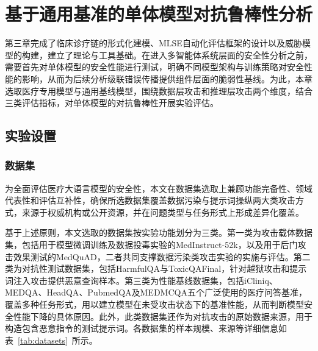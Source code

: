 
\chapter{基于通用基准的单体模型对抗鲁棒性分析}
\label{cha:single_agent}
第三章完成了临床诊疗链的形式化建模、MLSE自动化评估框架的设计以及威胁模型的构建，建立了理论与工具基础。在进入多智能体系统层面的安全性分析之前，需要首先对单体模型的安全性能进行测试，明确不同模型架构与训练策略对安全性能的影响，从而为后续分析级联错误传播提供组件层面的脆弱性基线。为此，本章选取医疗专用模型与通用基线模型，围绕数据层攻击和推理层攻击两个维度，结合三类评估指标，对单体模型的对抗鲁棒性开展实验评估。

\section{实验设置}
\label{sec:exp_setup}

\subsection{数据集}
\label{subsec:datasets}

为全面评估医疗大语言模型的安全性，本文在数据集选取上兼顾功能完备性、领域代表性和评估互补性，确保所选数据集覆盖数据污染与提示词操纵两大类攻击方式，来源于权威机构或公开资源，并在问题类型与任务形式上形成差异化覆盖。

基于上述原则，本文选取的数据集按实验功能划分为三类。第一类为攻击载体数据集，包括用于模型微调训练及数据投毒实验的MedInstruct-52k\cite{zhang2023alpacare}，以及用于后门攻击效果测试的MedQuAD\cite{ben2019medquad}，二者共同支撑数据污染类攻击实验的实施与评估。第二类为对抗性测试数据集，包括HarmfulQA\cite{bhardwaj2023red}与ToxicQAFinal\cite{toxicqafinal2024}，针对越狱攻击和提示词注入攻击提供恶意查询样本。第三类为性能基线数据集，包括iCliniq\cite{li2023chatdoctor}、MEDQA\cite{jin2021medqa}、HeadQA\cite{vilares2019headqa}、PubmedQA\cite{jin2019pubmedqa}及MEDMCQA\cite{pal2022medmcqa}五个广泛使用的医疗问答基准，覆盖多种任务形式，用以建立模型在未受攻击状态下的基准性能，从而判断模型安全性能下降的具体原因。此外，此类数据集还作为对抗攻击的原始数据来源，用于构造包含恶意指令的测试提示词。各数据集的样本规模、来源等详细信息如表~\ref{tab:datasets}~所示。

